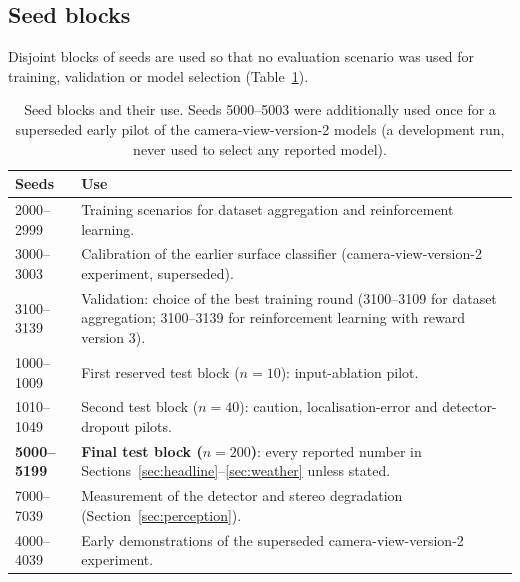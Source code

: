 \subsection{Seed blocks}
Disjoint blocks of seeds are used so that no evaluation scenario was used for training, validation or model selection (Table~\ref{tab:seeds}).
\begin{table}[H]\centering\small
\caption{Seed blocks and their use. Seeds 5000--5003 were additionally used once for a superseded early pilot of the camera-view-version-2 models (a development run, never used to select any reported model).}\label{tab:seeds}
\begin{tabularx}{\textwidth}{@{}l>{\raggedright\arraybackslash}X@{}}\toprule
Seeds & Use\\\midrule
2000--2999 & Training scenarios for dataset aggregation and reinforcement learning.\\
3000--3003 & Calibration of the earlier surface classifier (camera-view-version-2 experiment, superseded).\\
3100--3139 & Validation: choice of the best training round (3100--3109 for dataset aggregation; 3100--3139 for reinforcement learning with reward version 3).\\
1000--1009 & First reserved test block ($n=10$): input-ablation pilot.\\
1010--1049 & Second test block ($n=40$): caution, localisation-error and detector-dropout pilots.\\
\textbf{5000--5199} & \textbf{Final test block ($n=200$)}: every reported number in Sections~\ref{sec:headline}--\ref{sec:weather} unless stated.\\
7000--7039 & Measurement of the detector and stereo degradation (Section~\ref{sec:perception}).\\
4000--4039 & Early demonstrations of the superseded camera-view-version-2 experiment.\\\bottomrule
\end{tabularx}
\end{table}

